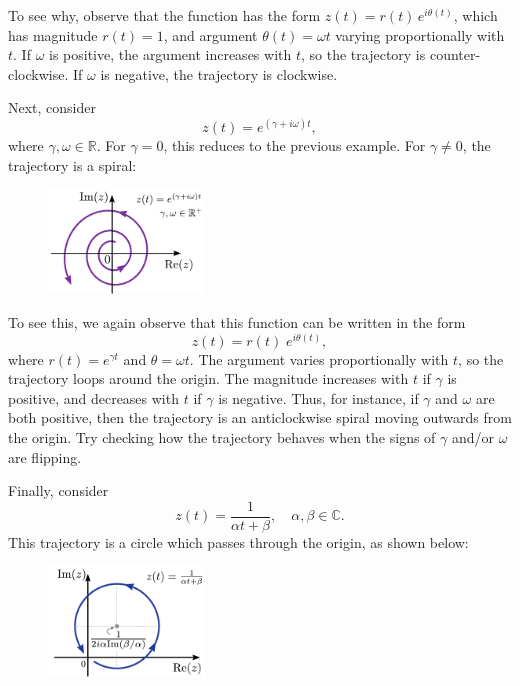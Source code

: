 \documentclass[10pt,a4paper]{article}
\begin{document}
\noindent
To see why, observe that the function has the form $z(t) =
r(t)\,e^{i\theta(t)}$, which has magnitude $r(t) = 1$, and argument
$\theta(t) = \omega t$ varying proportionally with $t$. If $\omega$ is
positive, the argument increases with $t$, so the trajectory is
counter-clockwise.  If $\omega$ is negative, the trajectory is
clockwise.

\clearpage

Next, consider
\begin{equation}
  z(t) = e^{(\gamma + i \omega) t},
\end{equation}
where $\gamma,\omega \in \mathbb{R}.$ For $\gamma = 0$, this reduces
to the previous example. For $\gamma \ne 0$, the trajectory is a
spiral:

\begin{figure}[ht]
  \centering\includegraphics[width=0.37\textwidth]{complex_trajectory_2}
\end{figure}

\noindent
To see this, we again observe that this function can be written in the
form
\begin{equation}
  z(t) = r(t) \;e^{i\theta(t)},
\end{equation}
where $r(t) = e^{\gamma t}$ and $\theta = \omega t.$ The argument
varies proportionally with $t$, so the trajectory loops around the
origin. The magnitude increases with $t$ if $\gamma$ is positive, and
decreases with $t$ if $\gamma$ is negative. Thus, for instance, if
$\gamma$ and $\omega$ are both positive, then the trajectory is an
anticlockwise spiral moving outwards from the origin. Try checking how
the trajectory behaves when the signs of $\gamma$ and/or $\omega$ are
flipping.

Finally, consider
\begin{equation}
  z(t) = \frac{1}{\alpha t + \beta}, \quad \alpha, \beta \in \mathbb{C}.
\end{equation}
This trajectory is a circle which passes through the origin, as shown
below:

\begin{figure}[ht]
  \centering\includegraphics[width=0.37\textwidth]{complex_trajectory_3}
\end{figure}
\end{document}
